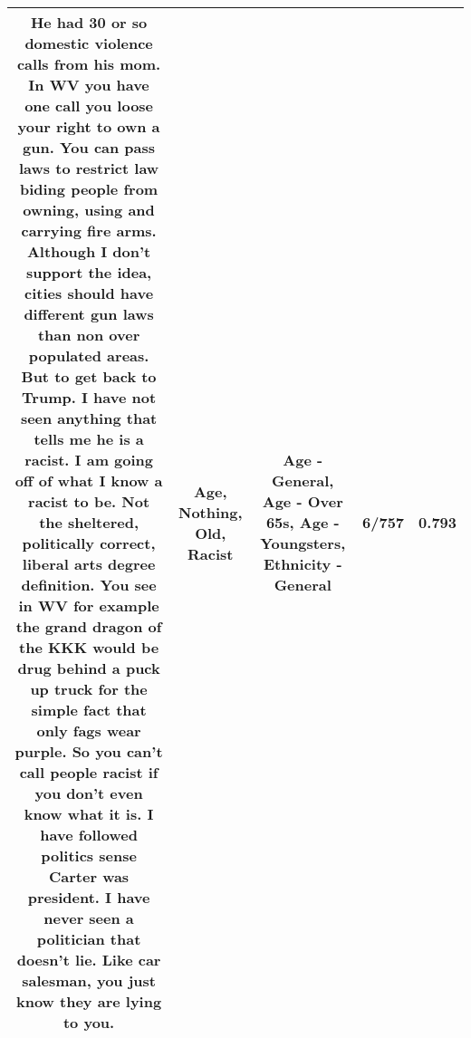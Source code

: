 \documentclass[11pt]{article}
\newlength\mylength
\begin{document}
\begin{center}
\begin{longtable}{|C{.65\mylength}|C{.30\mylength}|C{.12\mylength}|C{.12\mylength}|C{.12\mylength}|}
He had 30 or so domestic violence calls from his mom. In WV you have one call you loose your right to own a gun. You can pass laws to restrict law biding people from owning, using and carrying fire arms. Although I don't support the idea, cities should have different gun laws than non over populated areas. But to get back to Trump. I have not seen anything that tells me he is a \textbf{racist}. I am going off of what I know a \textbf{racist} to be. Not the sheltered, politically correct, liberal arts degree definition. You see in WV for example the grand dragon of the KKK would be drug behind a puck up truck for the simple fact that only fags wear purple. So you can't call people \textbf{racist} if you don't even know what it is. I have followed politics sense Carter was president. I have never seen a politician that doesn't lie. Like car salesman, you just know they are lying to you.\normalsize   & Age, Nothing, Old, Racist & Age - General, Age - Over 65s, Age - Youngsters, Ethnicity - General & 6/757 & 0.793 \\  \hline

\end{longtable}
\end{center}
\end{document}
